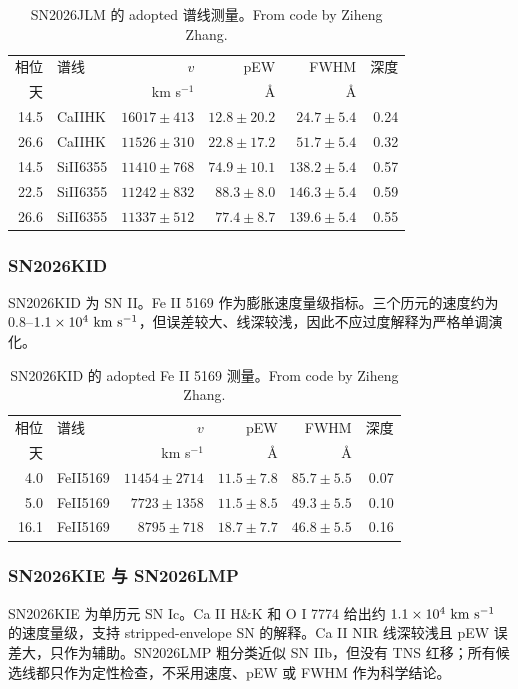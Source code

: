 \documentclass[11pt]{article}
\begin{document}
\begin{table}[htbp]
\centering
\caption{SN2026JLM 的 adopted 谱线测量。From code by Ziheng Zhang.}
\label{tab:jlm-lines}
\begin{tabular}{r l r r r r}
\toprule
相位 & 谱线 & $v$ & pEW & FWHM & 深度 \\
天 & & km s$^{-1}$ & \AA & \AA & \\
\midrule
14.5 & CaIIHK & $16017\pm413$ & $12.8\pm20.2$ & $24.7\pm5.4$ & 0.24 \\
26.6 & CaIIHK & $11526\pm310$ & $22.8\pm17.2$ & $51.7\pm5.4$ & 0.32 \\
14.5 & SiII6355 & $11410\pm768$ & $74.9\pm10.1$ & $138.2\pm5.4$ & 0.57 \\
22.5 & SiII6355 & $11242\pm832$ & $88.3\pm8.0$ & $146.3\pm5.4$ & 0.59 \\
26.6 & SiII6355 & $11337\pm512$ & $77.4\pm8.7$ & $139.6\pm5.4$ & 0.55 \\
\bottomrule
\end{tabular}
\end{table}

\subsubsection{SN2026KID}
SN2026KID 为 SN II。Fe II 5169 作为膨胀速度量级指标。三个历元的速度约为 $0.8$--$1.1\times10^4~{\rm km~s^{-1}}$，但误差较大、线深较浅，因此不应过度解释为严格单调演化。

\begin{table}[htbp]
\centering
\caption{SN2026KID 的 adopted Fe II 5169 测量。From code by Ziheng Zhang.}
\label{tab:kid-lines}
\begin{tabular}{r l r r r r}
\toprule
相位 & 谱线 & $v$ & pEW & FWHM & 深度 \\
天 & & km s$^{-1}$ & \AA & \AA & \\
\midrule
4.0 & FeII5169 & $11454\pm2714$ & $11.5\pm7.8$ & $85.7\pm5.5$ & 0.07 \\
5.0 & FeII5169 & $7723\pm1358$ & $11.5\pm8.5$ & $49.3\pm5.5$ & 0.10 \\
16.1 & FeII5169 & $8795\pm718$ & $18.7\pm7.7$ & $46.8\pm5.5$ & 0.16 \\
\bottomrule
\end{tabular}
\end{table}

\subsubsection{SN2026KIE 与 SN2026LMP}
SN2026KIE 为单历元 SN Ic。Ca II H\&K 和 O I 7774 给出约 $1.1\times10^4~{\rm km~s^{-1}}$ 的速度量级，支持 stripped-envelope SN 的解释。Ca II NIR 线深较浅且 pEW 误差大，只作为辅助。SN2026LMP 粗分类近似 SN IIb，但没有 TNS 红移；所有候选线都只作为定性检查，不采用速度、pEW 或 FWHM 作为科学结论。
\end{document}

